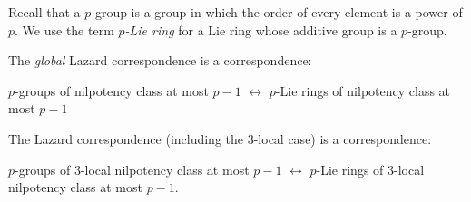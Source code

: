 Recall that a $p$-group is a group in which the order of every element is
a power of $p$. We use the term {\em $p$-Lie ring} for a Lie ring
whose additive group is a $p$-group.

The {\em global} Lazard correspondence is a correspondence:

$p$-groups of nilpotency class at most $p - 1$ $\leftrightarrow$
$p$-Lie rings of nilpotency class at most $p - 1$

The Lazard correspondence (including the $3$-local case) is a
correspondence:

$p$-groups of $3$-local nilpotency class at most $p - 1$
$\leftrightarrow$ $p$-Lie rings of $3$-local nilpotency class at most
$p - 1$.
